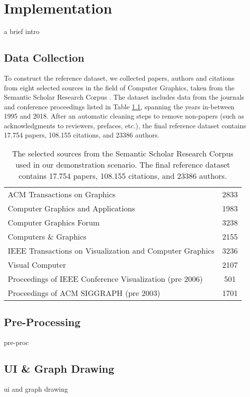 
\newpage
\chapter{Implementation}
a brief intro
\section{Data Collection}
To construct the reference dataset, we collected papers, authors and citations from eight selected sources in the field of Computer Graphics, taken from the Semantic Scholar Research Corpus \cite{ammar:18}. The dataset includes data from the journals and conference proceedings listed in Table \ref{table:sources}, spanning the years in-between 1995 and 2018. After an automatic cleaning steps to remove non-papers (such as acknowledgments to reviewers, prefaces, etc.), the final reference dataset contains 17.754 papers, 108.155 citations, and 23386 authors.
\begin{table}[!h]
\renewcommand{\arraystretch}{1.3}
\centering
\begin{tabular}{|l|c|}
\hline
ACM Transactions on Graphics & 2833\\ 
Computer Graphics and Applications  & 1983 \\ 
Computer Graphics Forum & 3238\\ 
Computers \& Graphics & 2155\\ 
IEEE Transactions on Visualization and Computer Graphics & 3236\\ 
Visual Computer & 2107\\ 
Proceedings of IEEE Conference Visualization (pre 2006) & 501 \\ 
Proceedings of ACM SIGGRAPH (pre 2003) & 1701\\
\hline
\end{tabular}
\caption{The selected sources from the Semantic Scholar Research Corpus used in our demonstration scenario. The final reference dataset contains 17.754 papers, 108.155 citations, and 23386 authors.}
\label{table:sources}
\end{table}

%
\section{Pre-Processing}

pre-proc

\section{UI \& Graph Drawing}

ui and graph drawing

\newpage